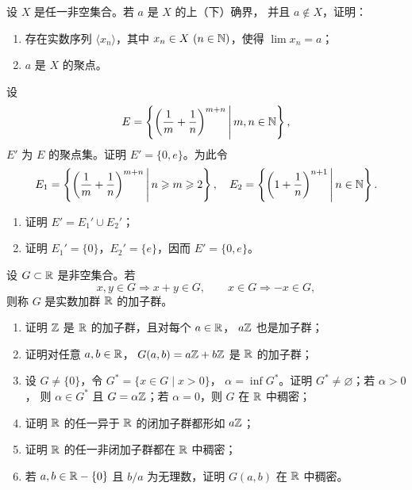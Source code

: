 \begin{exercise}
\item 设 \(X\) 是任一非空集合。若 \(a\) 是 \(X\) 的上（下）确界，
并且 \(a\notin X\)，证明：
\begin{enumerate}[label=\arabic*)]
  \item 存在实数序列 \(\langle x_n\rangle\)，其中
  \(x_n\in X\ (n\in\mathbb{N})\)，使得 \(\lim x_n=a\)；
  \item \(a\) 是 \(X\) 的聚点。
\end{enumerate}
\end{exercise}

\begin{exercise}
\item 设
\[
E=\left\{\left(\frac1m+\frac1n\right)^{m+n}\,\middle|\,m,n\in\mathbb{N}\right\},
\]
\(E'\) 为 \(E\) 的聚点集。证明 \(E'=\{0,e\}\)。为此令
\[
E_1=\left\{\left(\frac1m+\frac1n\right)^{m+n}\,\middle|\,n\geqslant m\geqslant2\right\},
\quad
E_2=\left\{\left(1+\frac1n\right)^{n+1}\,\middle|\,n\in\mathbb{N}\right\}.
\]
\begin{enumerate}[label=\arabic*)]
  \item 证明 \(E'=E_1'\cup E_2'\)；
  \item 证明 \(E_1'=\{0\}\)，\(E_2'=\{e\}\)，因而 \(E'=\{0,e\}\)。
\end{enumerate}
\end{exercise}

\begin{exercise}
\item 设 \(G\subset\mathbb{R}\) 是非空集合。若
\[
x,y\in G\Longrightarrow x+y\in G,\qquad
x\in G\Longrightarrow -x\in G,
\]
则称 \(G\) 是实数加群 \(\mathbb{R}\) 的加子群。
\begin{enumerate}[label=\arabic*)]
  \item 证明 \(\mathbb{Z}\) 是 \(\mathbb{R}\) 的加子群，且对每个 \(a\in\mathbb{R}\)，
  \(a\mathbb{Z}\) 也是加子群；
  \item 证明对任意 \(a,b\in\mathbb{R}\)，
  \(G(a,b)=a\mathbb{Z}+b\mathbb{Z}\) 是 \(\mathbb{R}\) 的加子群；
  \item 设 \(G\ne\{0\}\)，令 \(G^*=\{x\in G\mid x>0\}\)，
  \(\alpha=\inf G^*\)。证明 \(G^*\ne\varnothing\)；若 \(\alpha>0\)，
  则 \(\alpha\in G^*\) 且 \(G=\alpha\mathbb{Z}\)；若 \(\alpha=0\)，则 \(G\) 在
  \(\mathbb{R}\) 中稠密；
  \item 证明 \(\mathbb{R}\) 的任一异于 \(\mathbb{R}\) 的闭加子群都形如 \(a\mathbb{Z}\)；
  \item 证明 \(\mathbb{R}\) 的任一非闭加子群都在 \(\mathbb{R}\) 中稠密；
  \item 若 \(a,b\in\mathbb{R}-\{0\}\) 且 \(b/a\) 为无理数，证明
  \(G(a,b)\) 在 \(\mathbb{R}\) 中稠密。
\end{enumerate}
\end{exercise}

